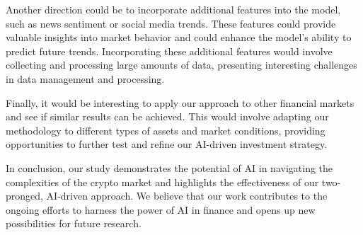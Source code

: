 \documentclass[journal]{IEEEtran}
\begin{document}
Another direction could be to incorporate additional features into the model, such as news sentiment or social media trends. These features could provide valuable insights into market behavior and could enhance the model's ability to predict future trends. Incorporating these additional features would involve collecting and processing large amounts of data, presenting interesting challenges in data management and processing.

Finally, it would be interesting to apply our approach to other financial markets and see if similar results can be achieved. This would involve adapting our methodology to different types of assets and market conditions, providing opportunities to further test and refine our AI-driven investment strategy.

In conclusion, our study demonstrates the potential of AI in navigating the complexities of the crypto market and highlights the effectiveness of our two-pronged, AI-driven approach. We believe that our work contributes to the ongoing efforts to harness the power of AI in finance and opens up new possibilities for future research.



\end{document}
